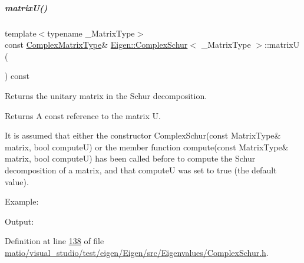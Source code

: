\mbox{\label{group___eigenvalues___module_afed8177cf9836f032d42bdb6c6bc6e01}} 
\subparagraph{\texorpdfstring{matrix\+U()}{matrixU()}\hspace{0.1cm}{\footnotesize\ttfamily [2/2]}}
{\footnotesize\ttfamily template$<$typename \+\_\+\+Matrix\+Type$>$ \\
const \hyperlink{group___eigenvalues___module_af61fe57877d51cfb50178f78534042f0}{Complex\+Matrix\+Type}\& \hyperlink{group___eigenvalues___module_class_eigen_1_1_complex_schur}{Eigen\+::\+Complex\+Schur}$<$ \+\_\+\+Matrix\+Type $>$\+::matrixU (\begin{DoxyParamCaption}{ }\end{DoxyParamCaption}) const\hspace{0.3cm}{\ttfamily [inline]}}



Returns the unitary matrix in the Schur decomposition. 

\begin{DoxyReturn}{Returns}
A const reference to the matrix U.
\end{DoxyReturn}
It is assumed that either the constructor Complex\+Schur(const Matrix\+Type\& matrix, bool compute\+U) or the member function compute(const Matrix\+Type\& matrix, bool compute\+U) has been called before to compute the Schur decomposition of a matrix, and that {\ttfamily computeU} was set to true (the default value).

Example\+: 
\begin{DoxyCodeInclude}
\end{DoxyCodeInclude}
 Output\+: 
\begin{DoxyVerbInclude}
\end{DoxyVerbInclude}
 

Definition at line \hyperlink{matio_2visual__studio_2test_2eigen_2_eigen_2src_2_eigenvalues_2_complex_schur_8h_source_l00138}{138} of file \hyperlink{matio_2visual__studio_2test_2eigen_2_eigen_2src_2_eigenvalues_2_complex_schur_8h_source}{matio/visual\+\_\+studio/test/eigen/\+Eigen/src/\+Eigenvalues/\+Complex\+Schur.\+h}.

